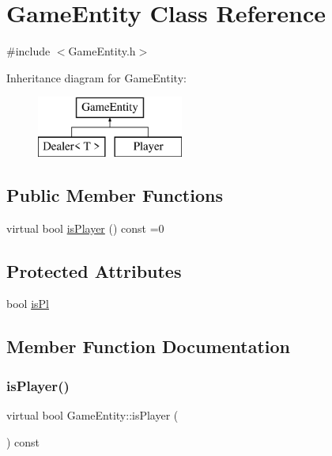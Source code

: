 \hypertarget{class_game_entity}{}\section{Game\+Entity Class Reference}
\label{class_game_entity}


{\ttfamily \#include $<$Game\+Entity.\+h$>$}

Inheritance diagram for Game\+Entity\+:\begin{figure}[H]
\begin{center}
\leavevmode
\includegraphics[height=2.000000cm]{class_game_entity}
\end{center}
\end{figure}
\subsection*{Public Member Functions}
\begin{DoxyCompactItemize}
\item 
virtual bool \mbox{\hyperlink{class_game_entity_a6528d6c01269ce943d690ca607e4cff8}{is\+Player}} () const =0
\end{DoxyCompactItemize}
\subsection*{Protected Attributes}
\begin{DoxyCompactItemize}
\item 
bool \mbox{\hyperlink{class_game_entity_adebee205c33cf1563ea5d9504b070944}{is\+Pl}}
\end{DoxyCompactItemize}


\subsection{Member Function Documentation}
\mbox{\label{class_game_entity_a6528d6c01269ce943d690ca607e4cff8}} 
\subsubsection{\texorpdfstring{is\+Player()}{isPlayer()}}
{\footnotesize\ttfamily virtual bool Game\+Entity\+::is\+Player (\begin{DoxyParamCaption}{ }\end{DoxyParamCaption}) const\hspace{0.3cm}{\ttfamily [pure virtual]}}



